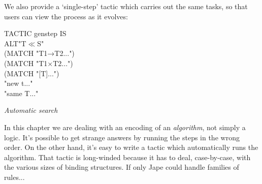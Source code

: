 \documentclass[11pt]{book}
\newcommand{\tab}{\hspace{5mm}}
\begin{document}
We also provide a `single-step' tactic which carries out the same tasks, so that users can view the process as it evolves:

TACTIC genstep IS \\
\tab ALT\tab "T$\ll$S" \\
\tab \tab (MATCH "T1→T2{\textbullet}...") \\
\tab \tab (MATCH "T1$\times$T2{\textbullet}...") \\
\tab \tab (MATCH "[T]{\textbullet}...") \\
\tab \tab "new t{\textbullet}..."\\
\tab \tab "same T{\textbullet}..."


\textit{Automatic search}


In this chapter we are dealing with an encoding of an \textit{algorithm}, not simply a logic. It's possible to get strange answers by running the steps in the wrong order. On the other hand, it's easy to write a tactic which automatically runs the algorithm. That tactic is long-winded because it has to deal, case-by-case, with the various sizes of binding structures. If only Jape could handle families of rules...
\end{document}
